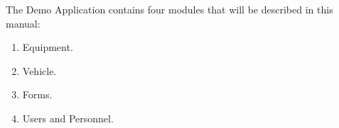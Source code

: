 \begin{titlepage}
	\vspace{5mm}
	The Demo Application contains four modules that will be described in this manual: 
	\begin{enumerate}
  \item Equipment.
  \item Vehicle.
  \item Forms.
  \item Users and Personnel. 
\end{enumerate}
\vspace{5mm}
	\begin{center}
\end{center}

    \clearpage
	
    \setcounter{tocdepth}{3}
    \tableofcontents

    \clearpage

\end{titlepage}
